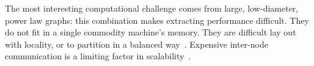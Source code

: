 \documentclass[10pt,nocopyrightspace,preprint]{sigplanconf}
\begin{document}






The most interesting computational challenge comes from large,
low-diameter, power law graphs: this combination makes extracting
performance difficult. They do not fit in a single commodity machine's
memory. They are difficult lay out with locality, or to partition in a
balanced way~\cite{lang, leskovec}. Expensive inter-node communication
is a limiting factor in scalability~\cite{yoo:parallelbfs}.



\end{document}

